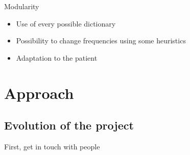 \documentclass[graphics]{beamer}
\begin{document}
\begin{frame}{Modularity}
	\begin{center}
		\begin{itemize}
			\item Use of every possible dictionary %
			\item Possibility to change frequencies using some heuristics
			\item Adaptation to the patient
		\end{itemize}
	\end{center}
\end{frame}

\section{Approach}
\subsection{Evolution of the project}
\begin{frame}{First, get in touch with people}
	\begin{center}
	\end{center}
\end{frame}
\end{document}
